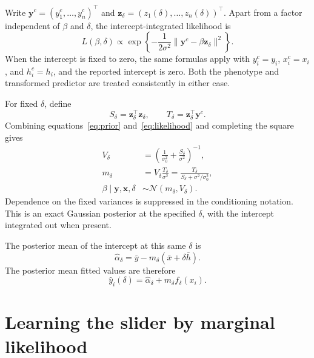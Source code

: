 \documentclass[11pt]{article}
\newcommand{\Normal}{\mathcal{N}}
\begin{document}
Write $\mathbf y^c=(y_1^c,\ldots,y_n^c)^\top$ and
$\mathbf z_\delta=(z_1(\delta),\ldots,z_n(\delta))^\top$. Apart from a
factor independent of $\beta$ and $\delta$, the intercept-integrated
likelihood is
\begin{equation}
L(\beta,\delta)\propto
\exp\left\{-\frac{1}{2\sigma^2}
\|\mathbf y^c-\beta\mathbf z_\delta\|^2\right\}.
\label{eq:likelihood}
\end{equation}
When the intercept is fixed to zero, the same formulas apply with
$y_i^c=y_i$, $x_i^c=x_i$, and $h_i^c=h_i$, and the reported intercept
is zero. Both the phenotype and transformed predictor are treated
consistently in either case.

For fixed $\delta$, define
\begin{equation}
S_\delta=\mathbf z_\delta^\top\mathbf z_\delta,
\qquad
T_\delta=\mathbf z_\delta^\top\mathbf y^c.
\end{equation}
Combining equations~\eqref{eq:prior} and~\eqref{eq:likelihood} and
completing the square gives
\begin{align}
V_\delta
 &=\left(\frac{1}{\sigma_0^2}+
              \frac{S_\delta}{\sigma^2}\right)^{-1},
    \label{eq:posterior-variance}\\
m_\delta
 &=V_\delta\frac{T_\delta}{\sigma^2}
  =\frac{T_\delta}{S_\delta+\sigma^2/\sigma_0^2},
    \label{eq:posterior-mean}\\
\beta\mid\mathbf y,\mathbf x,\delta
 &\sim\Normal(m_\delta,V_\delta).
    \label{eq:posterior}
\end{align}
Dependence on the fixed variances is suppressed in the conditioning
notation. This is an exact Gaussian posterior at the specified
$\delta$, with the intercept integrated out when present.

The posterior mean of the intercept at this same $\delta$ is
\begin{equation}
\widehat\alpha_\delta
 =\bar y-m_\delta(\bar x+\delta\bar h).
\label{eq:intercept}
\end{equation}
The posterior mean fitted values are therefore
\begin{equation}
\widehat y_i(\delta)
 =\widehat\alpha_\delta+m_\delta f_\delta(x_i).
\label{eq:fitted}
\end{equation}

\section{Learning the slider by marginal likelihood}
\end{document}
